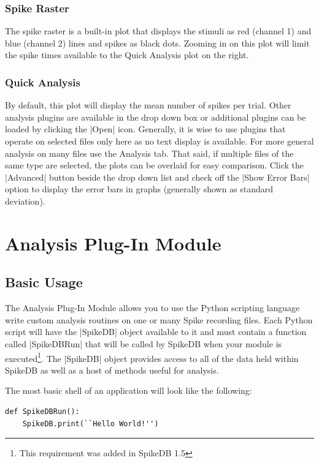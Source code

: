 \documentclass{report}
\begin{document}
\subsection{Spike Raster}
The spike raster is a built-in plot that displays the stimuli as red (channel 1) and blue (channel 2) lines and spikes as black dots. Zooming in on this plot will limit the spike times available to the Quick Analysis plot on the right.

\subsection{Quick Analysis}
By default, this plot will display the mean number of spikes per trial. Other analysis plugins are available in the drop down box or additional plugins can be loaded by clicking the |Open| icon. Generally, it is wise to use plugins that operate on selected files only here as no text display is available. For more general analysis on many files use the Analysis tab. That said, if multiple files of the same type are selected, the plots can be overlaid for easy comparison. Click the |Advanced| button beside the drop down list and check off the |Show Error Bars| option to display the error bars in graphs (generally shown as standard deviation).



\chapter{Analysis Plug-In Module}
\section{Basic Usage}
The Analysis Plug-In Module allows you to use the Python scripting language write custom analysis routines on one or many Spike recording files. Each Python script will have the |SpikeDB| object available to it and must contain a function called |SpikeDBRun| that will be called by SpikeDB when your module is executed\footnote{This requirement was added in SpikeDB 1.5}.  The |SpikeDB| object provides access to all of the data held within SpikeDB as well as a host of methods useful for analysis.

The most basic shell of an application will look like the following:
\begin{lstlisting}[caption=Example]
def SpikeDBRun():
	SpikeDB.print(``Hello World!'')
\end{lstlisting}
\end{document}
